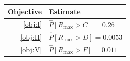 \begin{tabularx}{\linewidth}{r>{\centering\arraybackslash}X}
\toprule  Objective & Estimate\\\midrule
  \ref{obj:I} & $\hat{P}[R_{\max} > C] = 0.26$\\\addlinespace
  \ref{obj:II} & $\hat{P}[R_{\max} > D] = 0.0053$\\\addlinespace
  \ref{obj:V} & $\hat{P}[R_{\max} > F] = 0.011$\\\bottomrule
\end{tabularx}